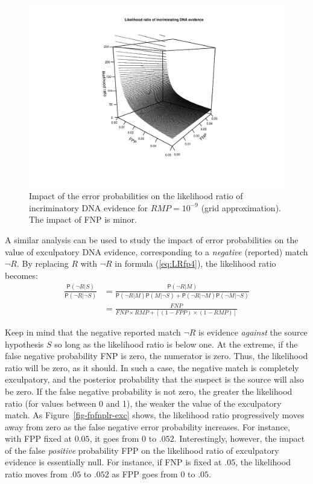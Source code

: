 \documentclass[
  letterpaper,
  DIV=11,
  numbers=noendperiod]{scrartcl}
\newcommand{\n}{\neg}
\newcommand{\pr}[1]{\mathsf{P}(#1)}
\begin{document}
\begin{figure}

{\centering \includegraphics[width=1\textwidth,height=\textheight]{Quart_lr-chapter6_files/figure-pdf/fig-fpplr-1.pdf}

}

\caption{\label{fig-fpplr}Impact of the error probabilities on the
likelihood ratio of incriminatory DNA evidence for \(RMP=10^{-9}\) (grid
approximation). The impact of FNP is minor.}

\end{figure}

A similar analysis can be used to study the impact of error
probabilities on the value of exculpatory DNA evidence, corresponding to
a \textit{negative} (reported) match \(\neg R\). By replacing \(R\) with
\(\neg R\) in formula (\ref{eq:LRfp4}), the likelihood ratio becomes:
\begin{align}
\label{eq:LR-match-exc}
\frac{\pr{\neg R \vert S}}{\pr{\neg R \vert \neg S}} & = 
\frac{\pr{\neg R \vert M}}{\pr{\neg R \vert M }\pr{M \vert \n S} + \pr{\neg R \vert \n M}\pr{\n M \vert \n S}}\\
& = \frac{FNP}{FNP\times RMP + [(1-FPP) \times (1-RMP)]}
\end{align}

\noindent Keep in mind that the negative reported match \(\neg R\) is
evidence \textit{against} the source hypothesis \(S\) so long as the
likelihood ratio is below one. At the extreme, if the false negative
probability FNP is zero, the numerator is zero. Thus, the likelihood
ratio will be zero, as it should. In such a case, the negative match is
completely exculpatory, and the posterior probability that the suspect
is the source will also be zero. If the false negative probability is
not zero, the greater the likelihood ratio (for values between 0 and 1),
the weaker the value of the exculpatory match. As
Figure~\ref{fig-fpfnplr-exc} shows, the likelihood ratio progressively
moves away from zero as the false negative error probability increases.
For instance, with FPP fixed at \(0.05\), it goes from 0 to \(.052\).
Interestingly, however, the impact of the false \textit{positive}
probability FPP on the likelihood ratio of exculpatory evidence is
essentially null. For instance, if FNP is fixed at \(.05\), the
likelihood ratio moves from \(.05\) to \(.052\) as FPP goes from 0 to
\(.05\).
\end{document}
